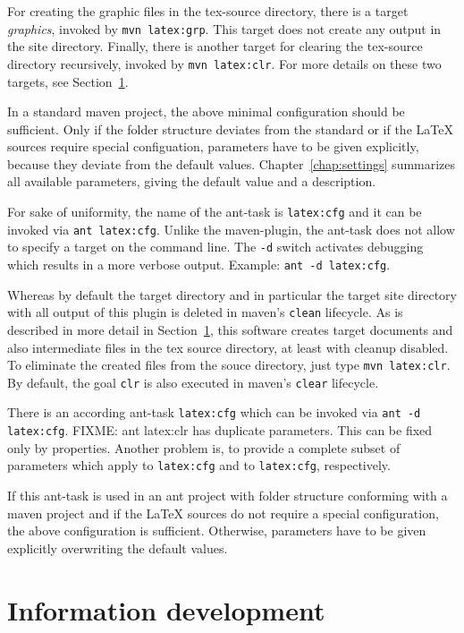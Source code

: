 \documentclass[12pt]{book}
\begin{document}
For creating the graphic files in the tex-source directory, 
there is a target {\em graphics}, invoked by \texttt{mvn latex:grp}. 
This target does not create any output in the site directory. 
Finally,  there is another target for clearing the tex-source directory 
recursively, invoked by \texttt{mvn latex:clr}. 
For more details on these two targets, see Section~\ref{sec:devel}. 

In a standard maven project, 
the above minimal configuration should be sufficient. 
Only if the folder structure deviates from the standard 
or if the \LaTeX{} sources require special configuation, 
parameters have to be given explicitly, 
because they deviate from the default values. 
Chapter~\ref{chap:settings} summarizes all available parameters, 
giving the default value and a description. 


For sake of uniformity, 
the name of the ant-task is \texttt{latex:cfg} 
and it can be invoked via \texttt{ant latex:cfg}. 
Unlike the maven-plugin, the ant-task 
does not allow to specify a target on the command line. 
The \texttt{-d} switch activates debugging 
which results in a more verbose output. 
Example: \texttt{ant -d latex:cfg}. 

Whereas by default the target directory and in particular 
the target site directory with all output of this plugin is deleted 
in maven's \texttt{clean} lifecycle. 
As is described in more detail in Section~\ref{sec:devel}, 
this software creates target documents and also intermediate files 
in the tex source directory, at least with cleanup disabled. 
To eliminate the created files from the souce directory, 
just type \texttt{mvn latex:clr}. 
By default, the goal \texttt{clr} 
is also executed in maven's \texttt{clear} lifecycle. 

There is an according ant-task \texttt{latex:cfg} 
which can be invoked via \texttt{ant -d latex:cfg}. 
FIXME: ant latex:clr has duplicate parameters. 
This can be fixed only by properties. 
Another problem is, to provide a complete subset of parameters 
which apply to \texttt{latex:cfg} and to \texttt{latex:cfg}, respectively. 

If this ant-task is used in an ant project 
with folder structure conforming with a maven project 
and if the \LaTeX{} sources do not require a special configuration, 
the above configuration is sufficient. 
Otherwise, parameters have to be given explicitly 
overwriting the default values. 

\section{Information development }\label{sec:devel}
\end{document}
